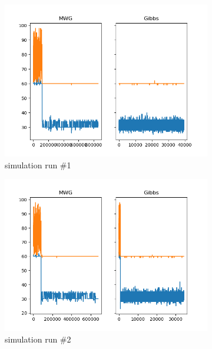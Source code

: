 \begin{figure}[H]
    \centering
    \begin{subfigure}{.3\textwidth}
    	\centering
        \includegraphics[width=\linewidth]{../../plots/Trace_M3_N100_NMCMC3_seed0_diffind2.png}
        \caption{simulation run \#1}
    \end{subfigure}
    \begin{subfigure}{.3\textwidth}
        \centering
    	\includegraphics[width=\linewidth]{../../plots/Trace_M3_N100_NMCMC3_seed1_diffind2.png}
    	\caption{simulation run \#2}
	\end{subfigure}
	\begin{subfigure}{.3\textwidth}
	    \centering

\end{subfigure}
\end{figure}
